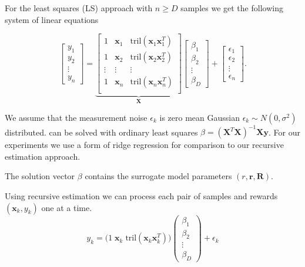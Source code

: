 For the least squares (LS) approach with $n \geq D$ samples
we get the following system of linear equations

\begin{equation}
  \label{eq:lgs}
\begin{bmatrix} y_1 \\ y_2 \\ \vdots \\ y_n \end{bmatrix}
=
\underbrace{
\begin{bmatrix}
  1 & \mathbf{x}_1 & \text{tril}(\mathbf{x}_1 \mathbf{x}_1^T) \\
  1 & \mathbf{x}_2 & \text{tril}(\mathbf{x}_2 \mathbf{x}_2^T) \\
  \vdots & \vdots & \vdots \\
  1 & \mathbf{x}_n & \text{tril}(\mathbf{x}_n \mathbf{x}_n^T) \\
\end{bmatrix}}_{\mathbf{X}}
\begin{bmatrix}
  \beta_1 \\ \beta_2 \\ \vdots \\ \beta_D
\end{bmatrix}
+
\begin{bmatrix}
  \epsilon_1 \\
  \epsilon_2 \\
  \vdots \\
  \epsilon_n
\end{bmatrix}.
\end{equation}

We assume that the measurement noise $\epsilon_k$ is zero mean Gaussian
$\epsilon_k \sim N(0, \sigma^2)$ distributed.
 can be solved with ordinary least squares
$\beta = (\mathbf{X}^T \mathbf{X})^{-1} \mathbf{X} \mathbf{y}$.
For our experiments we use a form of ridge regression \citep{hoerl1975ridge}
for comparison to our recursive estimation approach.


The solution vector $\beta$ contains the surrogate model parameters
$(r, \mathbf{r}, \mathbf{R})$.


Using recursive estimation we
can process each pair of samples and rewards $(\mathbf{x}_k, y_k)$ one
at a time.
$$
 y_k =
 \big(1 \;  \mathbf{x}_k \; \text{tril}(\mathbf{x}_k \mathbf{x}_k^T) \big)
\begin{pmatrix}
  \beta_1 \\ \beta_2 \\ \vdots \\ \beta_D
\end{pmatrix} 
+ \epsilon_k
$$
